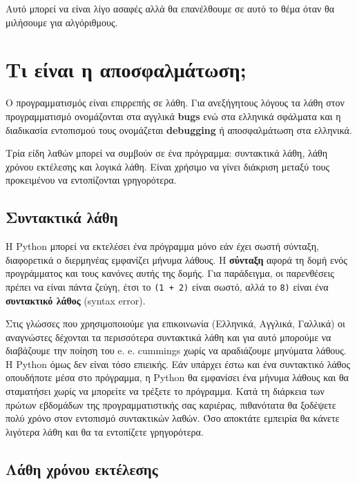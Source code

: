 \documentclass[10pt]{book}
\begin{document}
Αυτό μπορεί να είναι λίγο ασαφές αλλά θα επανέλθουμε σε αυτό το θέμα
όταν θα μιλήσουμε για αλγόριθμους.


\section{Τι είναι η αποσφαλμάτωση;}
Ο προγραμματισμός είναι επιρρεπής σε λάθη.  Για ανεξήγητους λόγους
τα λάθη στον προγραμματισμό ονομάζονται στα αγγλικά {\bf bugs} 
ενώ στα ελληνικά σφάλματα και η διαδικασία εντοπισμού τους ονομάζεται
{\bf debugging}  ή αποσφαλμάτωση στα ελληνικά.


Τρία είδη λαθών μπορεί να συμβούν σε ένα πρόγραμμα: συντακτικά λάθη,
λάθη χρόνου εκτέλεσης και λογικά λάθη. Είναι χρήσιμο να γίνει διάκριση
μεταξύ τους προκειμένου να εντοπίζονται γρηγορότερα.

\subsection{Συντακτικά λάθη}

Η Python μπορεί να εκτελέσει ένα πρόγραμμα μόνο εάν
έχει σωστή σύνταξη, διαφορετικά ο διερμηνέας εμφανίζει μήνυμα
λάθους.  Η {\bf σύνταξη} αφορά τη δομή ενός προγράμματος και τους
κανόνες αυτής της δομής. 
Για παράδειγμα, οι παρενθέσεις πρέπει να είναι πάντα ζεύγη,
έτσι το {\tt (1 + 2)} είναι σωστό, αλλά το {\tt 8)} είναι ένα
{\bf συντακτικό λάθος} (syntax error).


Στις γλώσσες που χρησιμοποιούμε για επικοινωνία (Ελληνικά, Αγγλικά, Γαλλικά) οι αναγνώστες δέχονται τα περισσότερα συντακτικά λάθη και για αυτό μπορούμε να διαβάζουμε την ποίηση του  e. e. cummings χωρίς να αραδιάζουμε μηνύματα λάθους.  Η Python όμως δεν
είναι τόσο επιεικής.  Εάν υπάρχει έστω και ένα συντακτικό λάθος
οπουδήποτε μέσα στο πρόγραμμα, η  Python  θα εμφανίσει ένα
μήνυμα λάθους και θα σταματήσει χωρίς να μπορείτε να τρέξετε
το πρόγραμμα.  Κατά τη διάρκεια των πρώτων εβδομάδων της προγραμματιστικής
σας καριέρας, πιθανότατα θα ξοδέψετε πολύ χρόνο στον εντοπισμό συντακτικών
λαθών.  Όσο αποκτάτε εμπειρία θα κάνετε λιγότερα λάθη και θα τα εντοπίζετε
γρηγορότερα.

\subsection{Λάθη χρόνου εκτέλεσης}
\label{runtime}
\end{document}
